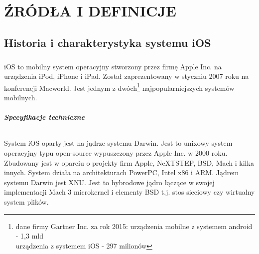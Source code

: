\documentclass[11pt,twoside,a4paper]{report}
\begin{document}
\chapter{ŹRÓDŁA I DEFINICJE}
\section{Historia i charakterystyka systemu iOS}
\paragraph{}iOS to mobilny system operacyjny stworzony przez firmę Apple Inc. na urządzenia iPod, iPhone i iPad. Został zaprezentowany w styczniu 2007 roku na konferencji Macworld. Jest jednym z dwóch\footnote{dane firmy Gartner Inc. za rok 2015: urządzenia mobilne z systemem android - 1,3 mld \\ urządzenia z systemem iOS - 297 milionów} najpopularniejszych systemów mobilnych. 
\paragraph{Specyfikacje techniczne}
\subparagraph{}System iOS oparty jest na jądrze systemu Darwin. Jest to unixowy system operacyjny typu open-source wypuszczony przez Apple Inc. w 2000 roku. Zbudowany jest w oparciu o projekty firm Apple, NeXTSTEP, BSD, Mach i kilka innych. System działa na architekturach PowerPC, Intel x86 i ARM.\cite{pureDarwin}\cite{openGroup} 
Jądrem systemu Darwin jest XNU. Jest to hybrodowe jądro łączące w swojej implementacji Mach 3 microkernel i elementy BSD t.j. stos sieciowy czy wirtualny system plików.\cite{XNUkernel}
\end{document}
